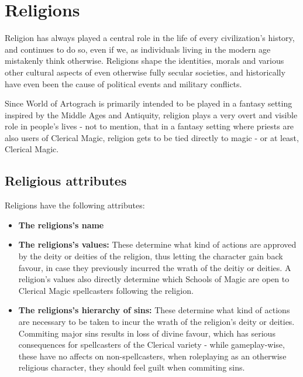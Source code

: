 \section{Religions}
Religion has always played a central role in the life of every civilization's history, and continues to do so, even if we, as individuals living in the modern age mistakenly think otherwise. Religions shape the identities, morals and various other cultural aspects of even otherwise fully secular societies, and historically have even been the cause of political events and military conflicts.

Since World of Artograch is primarily intended to be played in a fantasy setting inspired by the Middle Ages and Antiquity, religion plays a very overt and visible role in people's lives - not to mention, that in a fantasy setting where priests are also users of Clerical Magic, religion gets to be tied directly to magic - or at least, Clerical Magic.

\subsection{Religious attributes}
Religions have the following attributes:
\begin{itemize}
\item \textbf{The religions's name}
\item \textbf{The religions's values:} These determine what kind of actions are approved by the deity or deities of the religion, thus letting the character gain back favour, in case they previously incurred the wrath of the deitiy or deities. A religion's values also directly determine which Schools of Magic are open to Clerical Magic spellcasters following the religion.
\item \textbf{The religions's hierarchy of sins:} These determine what kind of actions are necessary to be taken to incur the wrath of the religion's deity or deities. Commiting major sins results in loss of divine favour, which has serious consequences for spellcasters of the Clerical variety - while gameplay-wise, these have no affects on non-spellcasters, when roleplaying as an otherwise religious character, they should feel guilt when commiting sins.
\end{itemize}
